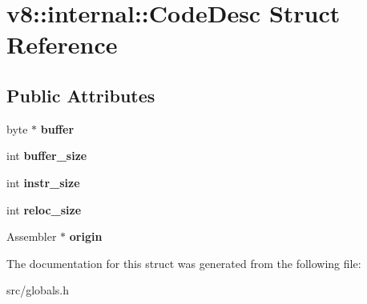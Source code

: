 \hypertarget{structv8_1_1internal_1_1_code_desc}{}\section{v8\+:\+:internal\+:\+:Code\+Desc Struct Reference}
\label{structv8_1_1internal_1_1_code_desc}
\subsection*{Public Attributes}
\begin{DoxyCompactItemize}
\item 
\hypertarget{structv8_1_1internal_1_1_code_desc_a7f81b61966443cefdb7d66bbb0da57bf}{}byte $\ast$ {\bfseries buffer}\label{structv8_1_1internal_1_1_code_desc_a7f81b61966443cefdb7d66bbb0da57bf}

\item 
\hypertarget{structv8_1_1internal_1_1_code_desc_ab886efa479651e14e7e6bc708a4be521}{}int {\bfseries buffer\+\_\+size}\label{structv8_1_1internal_1_1_code_desc_ab886efa479651e14e7e6bc708a4be521}

\item 
\hypertarget{structv8_1_1internal_1_1_code_desc_af887603bc5c17ab365f80879c2660727}{}int {\bfseries instr\+\_\+size}\label{structv8_1_1internal_1_1_code_desc_af887603bc5c17ab365f80879c2660727}

\item 
\hypertarget{structv8_1_1internal_1_1_code_desc_a4ec6827a7510122e162e8849e387f33b}{}int {\bfseries reloc\+\_\+size}\label{structv8_1_1internal_1_1_code_desc_a4ec6827a7510122e162e8849e387f33b}

\item 
\hypertarget{structv8_1_1internal_1_1_code_desc_a5ea7fab993fb8dbcc98653be2d9792e3}{}Assembler $\ast$ {\bfseries origin}\label{structv8_1_1internal_1_1_code_desc_a5ea7fab993fb8dbcc98653be2d9792e3}

\end{DoxyCompactItemize}


The documentation for this struct was generated from the following file\+:\begin{DoxyCompactItemize}
\item 
src/globals.\+h\end{DoxyCompactItemize}
